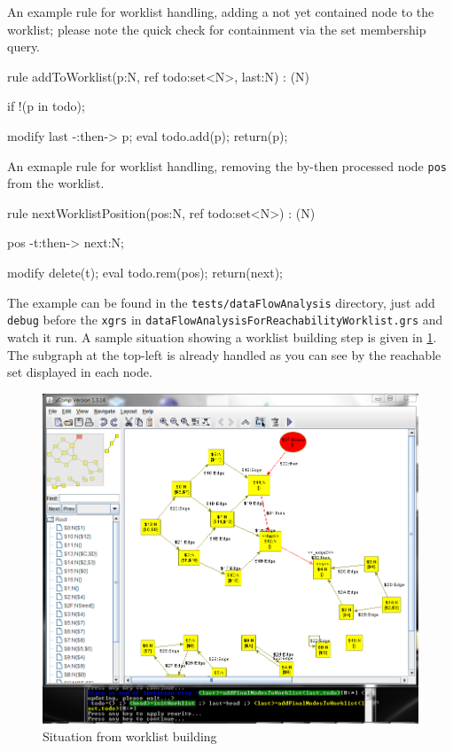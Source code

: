   \begin{example}
An example rule for worklist handling, adding a not yet contained node to the worklist; please note the quick check for containment via the set membership query.
    \begin{grgen}
rule addToWorklist(p:N, ref todo:set<N>, last:N) : (N)
{
  if{ !(p in todo); }
    
  modify {
    last -:then-> p;
    eval { todo.add(p); }
    return(p);
  }
}
    \end{grgen}
  \end{example}

  \begin{example}
An exmaple rule for worklist handling, removing the by-then processed node \texttt{pos} from the worklist.
    \begin{grgen}
rule nextWorklistPosition(pos:N, ref todo:set<N>) : (N)
{
  pos -t:then-> next:N;
  
  modify {
    delete(t);
    eval { todo.rem(pos); }
    return(next);
  }
}
    \end{grgen}
  \end{example}

The example can be found in the \texttt{tests/dataFlowAnalysis} directory, just add \texttt{debug} before the \texttt{xgrs} in \texttt{dataFlowAnalysisForReachabilityWorklist.grs} and watch it run.
A sample situation showing a worklist building step is given in \ref{figworklist}.
The subgraph at the top-left is already handled as you can see by the reachable set displayed in each node.

\begin{figure}[htbp]
  \centering
  \includegraphics[width=\textwidth]{fig/Worklist}
  \caption{Situation from worklist building}
  \label{figworklist}
\end{figure}

